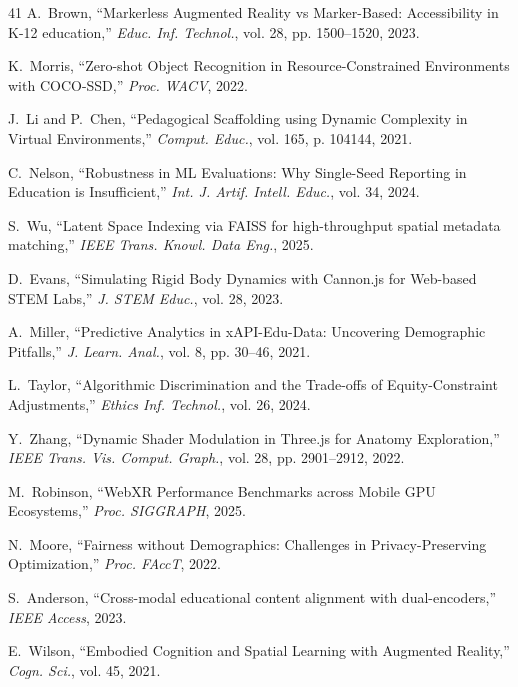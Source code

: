 \documentclass[conference]{IEEEtran}
\begin{document}
\begin{thebibliography}{41}
A.~Brown, ``Markerless Augmented Reality vs Marker-Based: Accessibility in K-12 education,'' \textit{Educ. Inf. Technol.}, vol. 28, pp. 1500--1520, 2023.

K.~Morris, ``Zero-shot Object Recognition in Resource-Constrained Environments with COCO-SSD,'' \textit{Proc. WACV}, 2022.

J.~Li and P.~Chen, ``Pedagogical Scaffolding using Dynamic Complexity in Virtual Environments,'' \textit{Comput. Educ.}, vol. 165, p. 104144, 2021.

C.~Nelson, ``Robustness in ML Evaluations: Why Single-Seed Reporting in Education is Insufficient,'' \textit{Int. J. Artif. Intell. Educ.}, vol. 34, 2024.

S.~Wu, ``Latent Space Indexing via FAISS for high-throughput spatial metadata matching,'' \textit{IEEE Trans. Knowl. Data Eng.}, 2025.

D.~Evans, ``Simulating Rigid Body Dynamics with Cannon.js for Web-based STEM Labs,'' \textit{J. STEM Educ.}, vol. 28, 2023.

A.~Miller, ``Predictive Analytics in xAPI-Edu-Data: Uncovering Demographic Pitfalls,'' \textit{J. Learn. Anal.}, vol. 8, pp. 30--46, 2021.

L.~Taylor, ``Algorithmic Discrimination and the Trade-offs of Equity-Constraint Adjustments,'' \textit{Ethics Inf. Technol.}, vol. 26, 2024.

Y.~Zhang, ``Dynamic Shader Modulation in Three.js for Anatomy Exploration,'' \textit{IEEE Trans. Vis. Comput. Graph.}, vol. 28, pp. 2901--2912, 2022.

M.~Robinson, ``WebXR Performance Benchmarks across Mobile GPU Ecosystems,'' \textit{Proc. SIGGRAPH}, 2025.

N.~Moore, ``Fairness without Demographics: Challenges in Privacy-Preserving Optimization,'' \textit{Proc. FAccT}, 2022.

S.~Anderson, ``Cross-modal educational content alignment with dual-encoders,'' \textit{IEEE Access}, 2023.

E.~Wilson, ``Embodied Cognition and Spatial Learning with Augmented Reality,'' \textit{Cogn. Sci.}, vol. 45, 2021.


\end{thebibliography}
\end{document}
